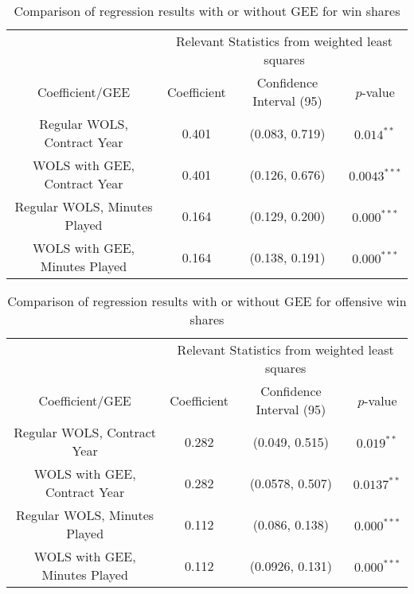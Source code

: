 \documentclass[12pt]{article}
\begin{document}
	\begin{table}[!htbp]
		\centering
		\caption{Comparison of regression results with or without GEE for win shares}
		\label{geelmcomparison} 
		\begin{tabular}{*4c}
			\toprule
			& \multicolumn{3}{c}{Relevant Statistics from weighted least squares} \\
			\cmidrule(lr){2-4}
			Coefficient/GEE & Coefficient  & Confidence Interval (95) & $p$-value \\
			\midrule
			Regular WOLS, Contract Year & 0.401       & (0.083, 0.719) & $0.014^{**}$       \\
			WOLS with GEE, Contract Year & 0.401      & (0.126, 0.676)       & $0.0043^{***}$ \\
			Regular WOLS, Minutes Played & 0.164       & (0.129, 0.200) & $0.000^{***}$ \\
			WOLS with GEE, Minutes Played & 0.164 & (0.138, 0.191)       & $0.000^{***}$       \\
			\bottomrule
		\end{tabular}
	\end{table}

	\begin{table}[!htbp]
		\centering
		\caption{Comparison of regression results with or without GEE for offensive win shares}
		\label{geelmcomparisonw} 
		\begin{tabular}{*4c}
			\toprule
			& \multicolumn{3}{c}{Relevant Statistics from weighted least squares} \\
			\cmidrule(lr){2-4}
			Coefficient/GEE & Coefficient  & Confidence Interval (95) & $p$-value \\
			\midrule
			Regular WOLS, Contract Year & 0.282       & (0.049, 0.515) & $0.019^{**}$       \\
			WOLS with GEE, Contract Year & 0.282      & (0.0578, 0.507)       & $0.0137^{**}$ \\
			Regular WOLS, Minutes Played & 0.112       & (0.086, 0.138) & $0.000^{***}$ \\
			WOLS with GEE, Minutes Played & 0.112 & (0.0926, 0.131)       & $0.000^{***}$       \\
			\bottomrule
		\end{tabular}
	\end{table}
\end{document}
